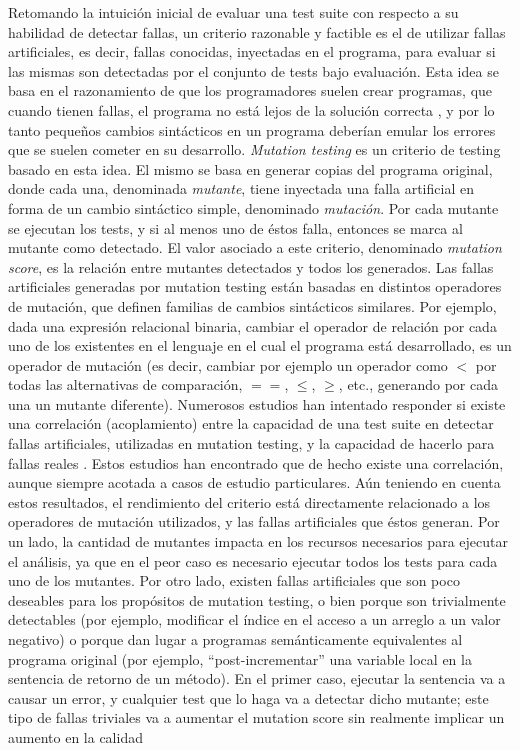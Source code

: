 Retomando la intuici\'on inicial de evaluar una test suite con respecto a su habilidad de detectar fallas, un criterio razonable y factible es el de utilizar fallas artificiales, es decir, fallas conocidas, inyectadas en el programa, para evaluar si las mismas son detectadas por el conjunto de tests bajo evaluaci\'on. Esta idea se basa en el razonamiento de que los programadores suelen crear programas, que cuando tienen fallas, el programa no est\'a lejos de la soluci\'on correcta \cite{bibliography.mutation.DeMillo}, y por lo tanto peque\~nos cambios sint\'acticos en un programa deber\'ian emular los errores que se suelen cometer en su desarrollo. \emph{Mutation testing} es un criterio de testing basado en esta idea. El mismo se basa en generar copias del programa original, donde cada una, denominada \emph{mutante}, tiene inyectada una falla artificial en forma de un cambio sint\'actico simple, denominado \emph{mutaci\'on}. Por cada mutante se ejecutan los tests, y si al menos uno de \'estos falla, entonces se marca al mutante como detectado. El valor asociado a este criterio, denominado \emph{mutation score}, es la relaci\'on entre mutantes detectados y todos los generados. Las fallas artificiales generadas por mutation testing est\'an basadas en distintos operadores de mutaci\'on, que definen familias de cambios sint\'acticos similares. Por ejemplo, dada una expresi\'on relacional binaria, cambiar el operador de relaci\'on por cada uno de los existentes en el lenguaje en el cual el programa est\'a desarrollado, es un operador de mutaci\'on (es decir, cambiar por ejemplo un operador como $<$ por todas las alternativas de comparaci\'on, $==$, $\le$, $\ge$, etc., generando por cada una un mutante diferente). Numerosos estudios han intentado responder si existe una correlaci\'on (acoplamiento) entre la capacidad de una test suite en detectar fallas artificiales, utilizadas en mutation testing, y la capacidad de hacerlo para fallas reales \cite{bibliography.mutation.evaluation.coupling.Offutt89, bibliography.mutation.evaluation.coupling.Offutt92, bibliography.mutation.evaluation.HAndrews05, bibliography.mutation.evaluation.valid-substitute}. Estos estudios han encontrado que de hecho existe una correlaci\'on, aunque siempre acotada a casos de estudio particulares. A\'un teniendo en cuenta estos resultados, el rendimiento del criterio est\'a directamente relacionado a los operadores de mutaci\'on utilizados, y las fallas artificiales que \'estos generan. Por un lado, la cantidad de mutantes impacta en los recursos necesarios para ejecutar el an\'alisis, ya que en el peor caso es necesario ejecutar todos los tests para cada uno de los mutantes. Por otro lado, existen fallas artificiales que son poco deseables para los prop\'ositos de mutation testing, o bien porque son trivialmente detectables (por ejemplo, modificar el \'indice en el acceso a un arreglo a un valor negativo) o porque dan lugar a programas sem\'anticamente equivalentes al programa original (por ejemplo, ``post-incrementar'' una variable local en la sentencia de retorno de un m\'etodo). En el primer caso, ejecutar la sentencia va a causar un error, y cualquier test que lo haga va a detectar dicho mutante; este tipo de fallas triviales va a aumentar el mutation score sin realmente implicar un aumento en la calidad 